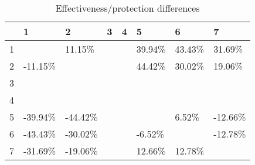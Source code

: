 \begin{table}[ht]
\centering
\begin{tabular}{rlllllll}
  \hline
 & 1 & 2 & 3 & 4 & 5 & 6 & 7 \\ 
  \hline
1 &  & 11.15\% &  &  & 39.94\% & 43.43\% & 31.69\% \\ 
  2 & -11.15\% &  &  &  & 44.42\% & 30.02\% & 19.06\% \\ 
  3 &  &  &  &  &  &  &  \\ 
  4 &  &  &  &  &  &  &  \\ 
  5 & -39.94\% & -44.42\% &  &  &  & 6.52\% & -12.66\% \\ 
  6 & -43.43\% & -30.02\% &  &  & -6.52\% &  & -12.78\% \\ 
  7 & -31.69\% & -19.06\% &  &  & 12.66\% & 12.78\% &  \\ 
   \hline
\end{tabular}
\caption{Effectiveness/protection differences} 
\end{table}
